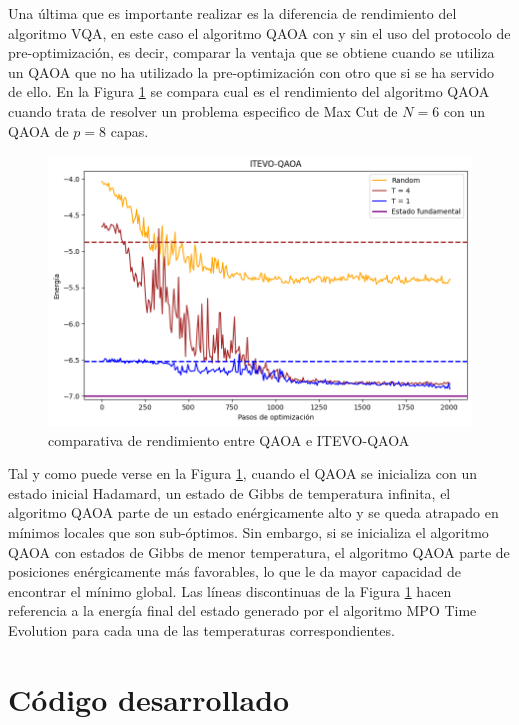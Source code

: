 Una última que es importante realizar es la diferencia de rendimiento del algoritmo VQA, en este caso el algoritmo QAOA con y sin el uso del protocolo de pre-optimización, es decir, comparar la ventaja que se obtiene cuando se utiliza un QAOA que no ha utilizado la pre-optimización con otro que si se ha servido de ello. En la Figura \ref{fig:itevo_qaoa} se compara cual es el rendimiento del algoritmo QAOA cuando trata de resolver un problema especifico de Max Cut de $N=6$ con un QAOA de $p=8$ capas.


\begin{figure}[!h]
    \centering
    \includegraphics[scale = 0.7]{plt/06-itevo_qaoa.png}
    \caption{comparativa de rendimiento entre QAOA e ITEVO-QAOA}
    \label{fig:itevo_qaoa}
\end{figure}

Tal y como puede verse en la Figura \ref{fig:itevo_qaoa}, cuando el QAOA se inicializa con un estado inicial Hadamard, un estado de Gibbs de temperatura infinita, el algoritmo QAOA parte de un estado enérgicamente alto y se queda atrapado en mínimos locales que son sub-óptimos. Sin embargo, si se inicializa el algoritmo QAOA con estados de Gibbs de menor temperatura, el algoritmo QAOA parte de posiciones enérgicamente más favorables, lo que le da mayor capacidad de encontrar el mínimo global. Las líneas discontinuas de la Figura \ref{fig:itevo_qaoa} hacen referencia a la energía final del estado generado por el algoritmo MPO Time Evolution para cada una de las temperaturas correspondientes.

\newpage

\section{Código desarrollado}

